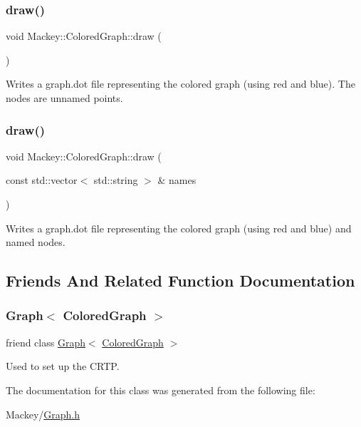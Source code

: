 \subsubsection{\texorpdfstring{draw()}{draw()}\hspace{0.1cm}{\footnotesize\ttfamily [1/2]}}
{\footnotesize\ttfamily void Mackey\+::\+Colored\+Graph\+::draw (\begin{DoxyParamCaption}{ }\end{DoxyParamCaption})}



Writes a graph.\+dot file representing the colored graph (using red and blue). The nodes are unnamed points. 

\mbox{\label{classMackey_1_1ColoredGraph_a912a6e5cb94386d9ff6510e968b41e7d}} 
\subsubsection{\texorpdfstring{draw()}{draw()}\hspace{0.1cm}{\footnotesize\ttfamily [2/2]}}
{\footnotesize\ttfamily void Mackey\+::\+Colored\+Graph\+::draw (\begin{DoxyParamCaption}\item[{const std\+::vector$<$ std\+::string $>$ \&}]{names }\end{DoxyParamCaption})}



Writes a graph.\+dot file representing the colored graph (using red and blue) and named nodes. 



\subsection{Friends And Related Function Documentation}
\mbox{\label{classMackey_1_1ColoredGraph_a2debfc8158c19d7b93550156a3e2676a}} 
\subsubsection{\texorpdfstring{Graph$<$ Colored\+Graph $>$}{Graph< ColoredGraph >}}
{\footnotesize\ttfamily friend class \hyperlink{classMackey_1_1Graph}{Graph}$<$ \hyperlink{classMackey_1_1ColoredGraph}{Colored\+Graph} $>$\hspace{0.3cm}{\ttfamily [friend]}}



Used to set up the C\+R\+TP. 



The documentation for this class was generated from the following file\+:\begin{DoxyCompactItemize}
\item 
Mackey/\hyperlink{Graph_8h}{Graph.\+h}\end{DoxyCompactItemize}

